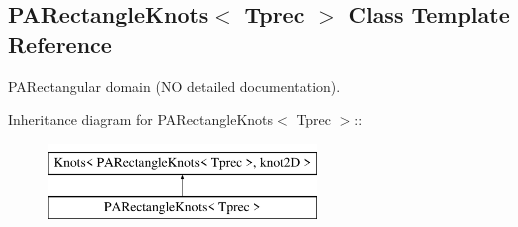 \hypertarget{classPARectangleKnots}{
\subsection{PARectangleKnots$<$ Tprec $>$ Class Template Reference}
\label{classPARectangleKnots}
}
PARectangular domain (NO detailed documentation).  


Inheritance diagram for PARectangleKnots$<$ Tprec $>$::\begin{figure}[H]
\begin{center}
\leavevmode
\includegraphics[height=2cm]{classPARectangleKnots}
\end{center}
\end{figure}
